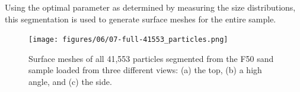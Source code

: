 Using the optimal parameter as determined by measuring the size distributions,
this segmentation is used to generate surface meshes for the entire sample.

\begin{figure}[ht]
    \centering
    \texttt{[image: figures/06/07-full-41553\_particles.png]}
    \caption{
        \small{}
        Surface meshes of all 41,553 particles segmented from the F50 sand
        sample loaded from three different views:
        (a) the top, (b) a high angle, and (c) the side.
    }
    \label{fig/06/full}
\end{figure}

